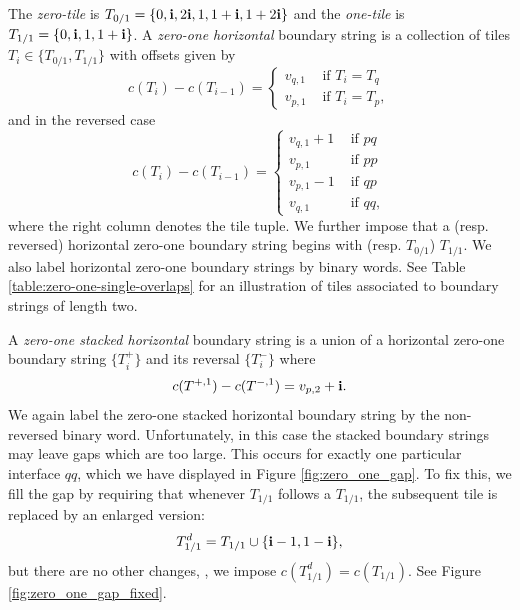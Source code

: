 \documentclass[12pt]{amsart}
\begin{document}
The {\it zero-tile} is $T_{0/1} = \{0, \mathbf{i}, 2 \mathbf{i}, 1, 1 + \mathbf{i}, 1 + 2\mathbf{i} \}$ and the {\it one-tile} is 
$T_{1/1} = \{0, \mathbf{i}, 1 , 1+ \mathbf{i}\}$.  A {\it zero-one}  {\it horizontal} boundary string is a collection of tiles $T_i \in \{T_{0/1}, T_{1/1}\}$ 
with offsets given by 
\begin{equation} \label{eq:zero-one-bs}
c(T_i) - c(T_{i-1}) = \begin{cases}
v_{q,1} &\mbox{ if $T_{i} = T_q$} \\
v_{p,1} &\mbox{ if $T_{i} = T_p$},
\end{cases}
\end{equation}
and in the reversed case 
\begin{equation} \label{eq:zero-one-bs-reversed}
c(T_i) - c(T_{i-1}) = \begin{cases}
v_{q,1}+1 &\mbox{ if $pq$} \\
v_{p,1} &\mbox{ if $pp$} \\
v_{p,1}-1 &\mbox{ if $qp$} \\
v_{q,1} &\mbox{ if $qq$},
\end{cases}
\end{equation}
where the right column denotes the tile tuple.
We further impose that a (resp. reversed) horizontal zero-one boundary string begins with (resp. $T_{0/1}$) $T_{1/1}$.  
We also label horizontal zero-one boundary strings by binary words. See Table \ref{table:zero-one-single-overlaps} for an illustration 
of tiles associated to boundary strings of length two. 



A {\it zero-one stacked horizontal} boundary string is a union of a horizontal zero-one boundary string $\{T_i^+\}$ and its reversal $\{T_i^-\}$ where
\begin{equation}\label{eq:stacked_boundary_string_even_odd_horizontal}
c(T^{+,1}) - c(T^{-,1}) = v_{p,2} + \mathbf{i}.
\end{equation}
We again label the zero-one stacked horizontal boundary string by the non-reversed binary word. 
Unfortunately, in this case the stacked boundary strings may leave gaps which are too large. 
This occurs for exactly one particular interface $qq$, which we have displayed in Figure \ref{fig:zero_one_gap}. 
To fix this, we fill the gap by requiring that whenever $T_{1/1}$ follows a $T_{1/1}$, 
the subsequent tile is replaced by an enlarged version: 
\begin{equation}
T_{1/1}^d = T_{1/1} \cup \{\mathbf{i} -1, 1 -\mathbf{i}\},
\end{equation}
but there are no other changes, \ie, we impose $c(T_{1/1}^d) = c(T_{1/1})$. See Figure \ref{fig:zero_one_gap_fixed}. 
\end{document}
